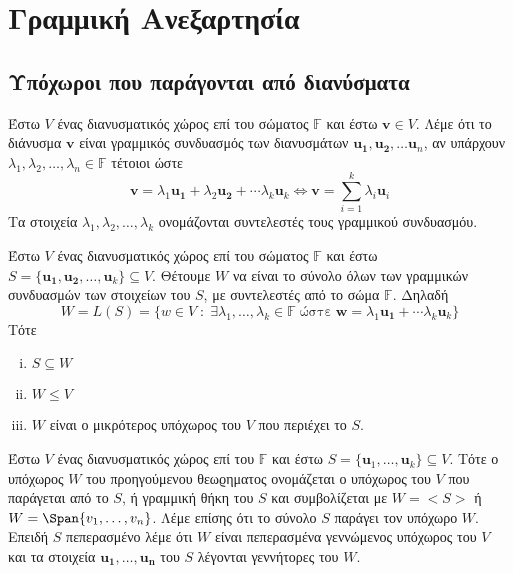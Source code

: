 \documentclass[a4paper,table]{report}
\begin{document}
\chapter{Γραμμική Ανεξαρτησία}

\section{Υπόχωροι που παράγονται από διανύσματα}

\begin{dfn}
  Έστω $ V $ ένας διανυσματικός χώρος επί του σώματος $ \mathbb{F} $ και έστω 
  $ \mathbf{v} \in V $. Λέμε ότι το διάνυσμα $ \mathbf{v}$ είναι 
  \textcolor{Col2}{γραμμικός συνδυασμός} των διανυσμάτων 
  $ \mathbf{u_{1}}, \mathbf{u_{2}}, \ldots \mathbf{u}_{n} $, αν υπάρχουν 
  $ \lambda _{1}, \lambda _{2}, \ldots, \lambda _{n} \in \mathbb{F} $ τέτοιοι ώστε 
  \[
    \mathbf{v} = \lambda _{1} \mathbf{u_{1}}+ \lambda_{2} \mathbf{u_{2}}+ 
    \cdots \lambda _{k} \mathbf{u}_{k} \Leftrightarrow \mathbf{v} = 
    \sum_{i=1}^{k} \lambda _{i} \mathbf{u}_{i} 
  \]
  Τα στοιχεία $ \lambda _{1}, \lambda _{2}, \ldots, \lambda _{k} $ ονομάζονται 
  \textcolor{Col2}{συντελεστές} τους γραμμικού συνδυασμόυ.
\end{dfn}

\begin{thm}
  Έστω $ V $ ένας διανυσματικός χώρος επί του σώματος $ \mathbb{F} $ και έστω 
  $ S = \{ \mathbf{u_{1}}, \mathbf{u_{2}}, \ldots, \mathbf{u}_{k}\} \subseteq V $.
  Θέτουμε $ W $ να είναι το σύνολο όλων των γραμμικών συνδυασμών των στοιχείων του 
  $S$, με συντελεστές από το σώμα $ \mathbb{F} $.  Δηλαδή 
  \[
    W = L(S) = \{ w \in V \; : \; \exists \lambda _{1}, \ldots, \lambda _{k} \in 
      \mathbb{F} \; \text{ώστε} \; \mathbf{w} = \lambda _{1} 
    \mathbf{u_{1}}+ \cdots \lambda _{k} \mathbf{u}_{k}\} 
  \] 
  Τότε
  \begin{enumerate}[i)]
    \item $ S \subseteq W $
    \item $ W \leq V $ 
    \item $ W $ είναι ο μικρότερος υπόχωρος του $V$ που περιέχει το $S$.
  \end{enumerate}
\end{thm}

\begin{dfn}
  Έστω $ V $ ένας διανυσματικός χώρος επί του $ \mathbb{F} $ και έστω $ S = 
  \{ \mathbf{u}_{1}, \ldots, \mathbf{u}_{k} \} \subseteq V$. Τότε ο υπόχωρος $ W $ 
  του προηγούμενου θεωϱηματος ονομάζεται ο υπόχωρος του $V$ που 
  \textcolor{Col2}{παράγεται} από το $ S $, ή γραμμική θήκη του $S$ και 
  συμβολίζεται με $ W = < S > $ ή $ W = \Span \{ v_{1},\ldots,v_{n}  \}  $.  
  Λέμε επίσης ότι το σύνολο $S$ \textcolor{Col2}{παράγει} τον υπόχωρο $W$. 
  Επειδή $S$  πεπερασμένο λέμε ότι $W$ είναι \textcolor{Col2}{πεπερασμένα 
  γεννώμενος} υπόχωρος του  $V$ και τα στοιχεία 
  $ \mathbf{u_{1}}, \ldots, \mathbf{u_{n}} $ του $S$ λέγονται 
  \textcolor{Col2}{γεννήτορες} του $W$.
\end{dfn}
\end{document}

